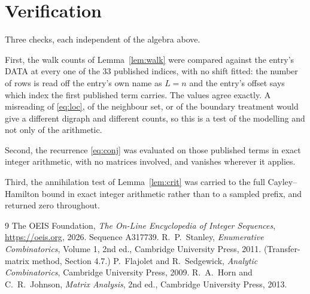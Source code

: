\documentclass[11pt,a4paper]{article}
\theoremstyle{plain}
\theoremstyle{definition}
\begin{document}
\section{Verification}

Three checks, each independent of the algebra above.

First, the walk counts of Lemma~\ref{lem:walk} were compared against the entry's DATA at
every one of the $33$ published indices, with no shift fitted: the number of rows is
read off the entry's own name as $L=n$ and the entry's offset says which index the first
published term carries. The values agree exactly. A misreading of \eqref{eq:loc}, of the
neighbour set, or of the boundary treatment would give a different digraph and different
counts, so this is a test of the modelling and not only of the arithmetic.

Second, the recurrence \eqref{eq:conj} was evaluated on those published terms in exact
integer arithmetic, with no matrices involved, and vanishes wherever it applies.

Third, the annihilation test of Lemma~\ref{lem:crit} was carried to the full
Cayley--Hamilton bound in exact integer arithmetic rather than to a sampled prefix, and
returned zero throughout.

\begin{thebibliography}{9}
 The OEIS Foundation, \emph{The On-Line Encyclopedia of Integer
Sequences}, \url{https://oeis.org}, 2026. Sequence A317739.
 R.~P.~Stanley, \emph{Enumerative Combinatorics}, Volume 1, 2nd ed.,
Cambridge University Press, 2011. (Transfer-matrix method, Section 4.7.)
 P.~Flajolet and R.~Sedgewick, \emph{Analytic Combinatorics}, Cambridge
University Press, 2009.
 R.~A.~Horn and C.~R.~Johnson, \emph{Matrix Analysis}, 2nd ed., Cambridge
University Press, 2013.
\end{thebibliography}
\end{document}
